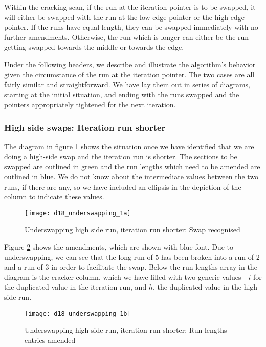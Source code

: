 Within the cracking scan, if the run at the iteration pointer is to be swapped, it will either be swapped with the run at the low edge pointer or the high edge pointer. If the runs have equal length, they can be swapped immediately with no further amendments. Otherwise, the run which is longer can either be the run getting swapped towards the middle or towards the edge.

Under the following headers, we describe and illustrate the algorithm's behavior given the circumstance of the run at the iteration pointer. The two cases are all fairly similar and straightforward. We have lay them out in series of diagrams, starting at the initial situation, and ending with the runs swapped and the pointers appropriately tightened for the next iteration.

\subsubsection{High side swaps: Iteration run shorter}

The diagram in figure \ref{fig:underswapping_1a} shows the situation once we have identified that we are doing a high-side swap and the iteration run is shorter. The sections to be swapped are outlined in green and the run lengths which need to be amended are outlined in blue. We do not know about the intermediate values between the two runs, if there are any, so we have included an ellipsis in the depiction of the column to indicate these values.

\begin{figure}[H]
  \centering
  \texttt{[image: d18\_underswapping\_1a]}
  \caption{Underswapping high side run, iteration run shorter: Swap recognised}
  \label{fig:underswapping_1a}
\end{figure}

Figure \ref{fig:underswapping_1b} shows the amendments, which are shown with blue font. Due to underswapping, we can see that the long run of 5 has been broken into a run of 2 and a run of 3 in order to facilitate the swap. Below the run lengths array in the diagram is the cracker column, which we have filled with two generic values - $i$ for the duplicated value in the iteration run, and $h$, the duplicated value in the high-side run.

\begin{figure}[H]
  \centering
  \texttt{[image: d18\_underswapping\_1b]}
  \caption{Underswapping high side run, iteration run shorter: Run lengths entries amended}
  \label{fig:underswapping_1b}
\end{figure}

